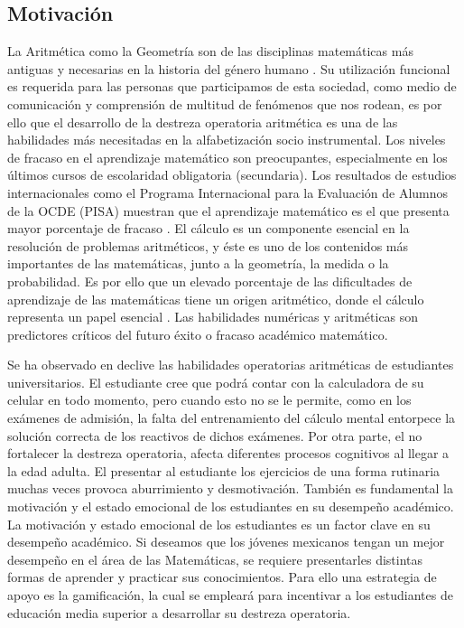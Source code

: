 \documentclass{article}
\begin{document}
\subsection{Motivación}
La Aritmética como la Geometría son de las disciplinas matemáticas más antiguas y necesarias en la historia del género humano \cite{coronado2014estudio}. 
Su utilización funcional es requerida para las personas que participamos de esta sociedad, como medio de comunicación y comprensión de multitud de fenómenos que nos rodean, es por ello que el desarrollo de la destreza operatoria aritmética es una de las habilidades más necesitadas en la alfabetización socio instrumental.
Los niveles de fracaso en el aprendizaje matemático son preocupantes, especialmente en los últimos cursos de escolaridad obligatoria (secundaria). Los resultados de estudios internacionales como el Programa Internacional para la Evaluación de Alumnos de la OCDE (PISA)\cite{oecd2014what,oecd2016low} muestran que el aprendizaje matemático es el que presenta mayor porcentaje de fracaso \cite{coronado2016academic, mullis2016timss}. El cálculo es un componente esencial en la resolución de problemas aritméticos, y éste es uno de los contenidos más importantes de las matemáticas, junto a la geometría, la medida o la probabilidad. 
Es por ello que un elevado porcentaje de las dificultades de aprendizaje de las matemáticas tiene un origen aritmético, donde el cálculo representa un papel esencial \cite{orrantia2006dificultades}. Las habilidades numéricas y aritméticas son predictores críticos del futuro éxito o fracaso académico matemático\cite{rodriguez2017marcadores}. 

Se ha observado en declive las habilidades operatorias aritméticas de estudiantes 
universitarios\cite{tariq2002decline,carpenter2017psychology,huang2013gamification}. 
El estudiante cree que podrá contar con la calculadora de su celular en todo momento, 
pero cuando esto no se le permite, como en los exámenes de admisión, la falta del 
entrenamiento del cálculo mental entorpece la solución correcta de los reactivos 
de dichos exámenes. Por otra parte, el no fortalecer la destreza operatoria, afecta 
diferentes procesos cognitivos al llegar a la edad adulta\cite{martin2003loss}.
El presentar al estudiante los ejercicios de una forma rutinaria muchas veces provoca 
aburrimiento y desmotivación. 
También es fundamental la motivación y el estado emocional de los estudiantes en su desempeño académico. La motivación y estado emocional de los estudiantes es un factor clave en su desempeño académico\cite{larrazolo2013habilidades,ryan1997should}. Si deseamos que los jóvenes 
mexicanos tengan un mejor desempeño en el área de las Matemáticas, se requiere presentarles 
distintas formas de aprender y practicar sus conocimientos. Para ello una estrategia de 
apoyo es la gamificación, la cual se empleará para incentivar a los estudiantes de educación 
media superior a desarrollar su destreza operatoria.
\end{document}
